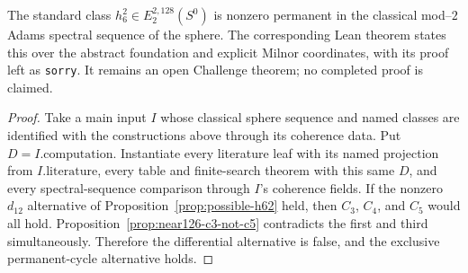 \begin{theorem}
  \label{thm:h6-square-permanent}
  \notready
  The standard class $h_6^2\in E_2^{2,128}(S^0)$ is nonzero permanent
  in the classical mod--$2$ Adams spectral sequence of the sphere.
  The corresponding Lean theorem states this over the abstract foundation
  and explicit Milnor coordinates, with its proof left as \texttt{sorry}.
  It remains an open Challenge theorem; no completed proof is claimed.
\end{theorem}

\begin{proof}
  Take a main input $I$ whose classical sphere sequence and named classes
  are identified with the constructions above through its coherence data.
  Put $D=I.\mathrm{computation}$.  Instantiate every literature leaf with its
  named projection from $I.\mathrm{literature}$, every table and finite-search
  theorem with this same $D$, and every spectral-sequence comparison through
  $I$'s coherence fields.  If the nonzero
  $d_{12}$ alternative of
  Proposition~\ref{prop:possible-h62} held, then $C_3$, $C_4$, and $C_5$ would
  all hold.  Proposition~\ref{prop:near126-c3-not-c5} contradicts the first and
  third simultaneously.  Therefore the differential alternative is false,
  and the exclusive permanent-cycle alternative holds.
\end{proof}
